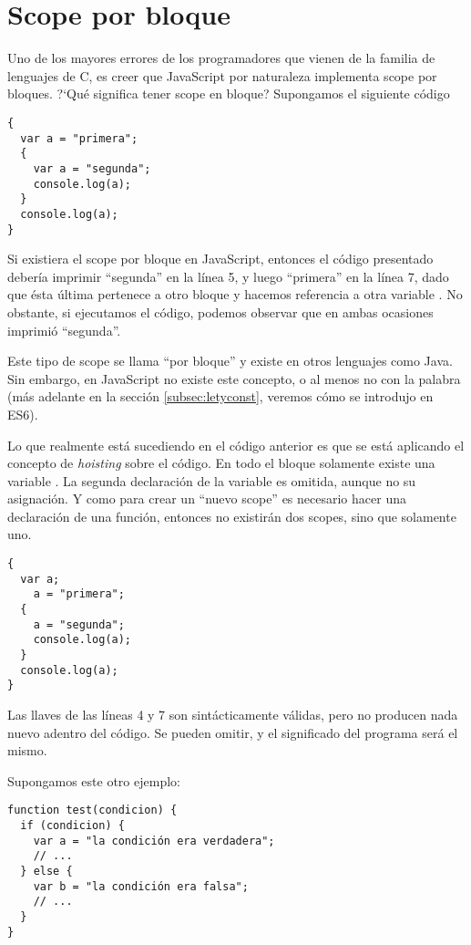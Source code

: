 \section{Scope por bloque}
\label{sec:scopebloque}

Uno de los mayores errores de los programadores que vienen de la familia de lenguajes de C, es creer que JavaScript por naturaleza implementa scope por bloques. ?`Qué significa tener scope en bloque? Supongamos el siguiente código

\begin{lstlisting}
{
  var a = "primera";
  {
    var a = "segunda";
    console.log(a);
  }
  console.log(a);
}
\end{lstlisting}

Si existiera el scope por bloque en JavaScript, entonces el código presentado debería imprimir "`segunda"' en la línea 5, y luego "`primera"' en la línea 7, dado que ésta última pertenece a otro bloque y hacemos referencia a otra variable . No obstante, si ejecutamos el código, podemos observar que en ambas ocasiones imprimió "`segunda"'.

Este tipo de scope se llama "`por bloque"' y existe en otros lenguajes como Java. Sin embargo, en JavaScript no existe este concepto, o al menos no con la palabra  (más adelante en la sección \ref{subsec:letyconst}, veremos cómo se introdujo en ES6).

Lo que realmente está sucediendo en el código anterior es que se está aplicando el concepto de \textit{hoisting} sobre el código. En todo el bloque solamente existe una variable . La segunda declaración de la variable es omitida, aunque no su asignación. Y como para crear un "`nuevo scope"' es necesario hacer una declaración de una función, entonces no existirán dos scopes, sino que solamente uno.

\begin{lstlisting}[title={Código equivalente al ejemplo anterior}]
{
  var a;
	a = "primera";
  {
    a = "segunda";
    console.log(a);
  }
  console.log(a);
}
\end{lstlisting}

Las llaves \code{\{\}} de las líneas 4 y 7 son sintácticamente válidas, pero no producen nada nuevo adentro del código. Se pueden omitir, y el significado del programa será el mismo.

Supongamos este otro ejemplo:

\begin{lstlisting}
function test(condicion) {
  if (condicion) {
    var a = "la condición era verdadera";
    // ...
  } else {
    var b = "la condición era falsa";
    // ...
  }
}
\end{lstlisting}

